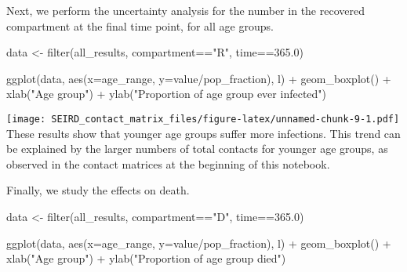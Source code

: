 \documentclass[
]{article}
\newenvironment{Shaded}{\begin{snugshade}}{\end{snugshade}}
\newcommand{\AttributeTok}[1]{\textcolor[rgb]{0.77,0.63,0.00}{#1}}
\newcommand{\FloatTok}[1]{\textcolor[rgb]{0.00,0.00,0.81}{#1}}
\newcommand{\FunctionTok}[1]{\textcolor[rgb]{0.00,0.00,0.00}{#1}}
\newcommand{\NormalTok}[1]{#1}
\newcommand{\OtherTok}[1]{\textcolor[rgb]{0.56,0.35,0.01}{#1}}
\newcommand{\SpecialCharTok}[1]{\textcolor[rgb]{0.00,0.00,0.00}{#1}}
\newcommand{\StringTok}[1]{\textcolor[rgb]{0.31,0.60,0.02}{#1}}
\begin{document}
Next, we perform the uncertainty analysis for the number in the
recovered compartment at the final time point, for all age groups.

\begin{Shaded}
\begin{Highlighting}[]

\NormalTok{data }\OtherTok{\textless{}{-}} \FunctionTok{filter}\NormalTok{(all\_results, compartment}\SpecialCharTok{==}\StringTok{"R"}\NormalTok{, time}\SpecialCharTok{==}\FloatTok{365.0}\NormalTok{)}

\FunctionTok{ggplot}\NormalTok{(data, }\FunctionTok{aes}\NormalTok{(}\AttributeTok{x=}\NormalTok{age\_range, }\AttributeTok{y=}\NormalTok{value}\SpecialCharTok{/}\NormalTok{pop\_fraction), l) }\SpecialCharTok{+}
  \FunctionTok{geom\_boxplot}\NormalTok{() }\SpecialCharTok{+}
  \FunctionTok{xlab}\NormalTok{(}\StringTok{"Age group"}\NormalTok{) }\SpecialCharTok{+}
  \FunctionTok{ylab}\NormalTok{(}\StringTok{"Proportion of age group ever infected"}\NormalTok{)}
\end{Highlighting}
\end{Shaded}

\texttt{[image: SEIRD\_contact\_matrix\_files/figure-latex/unnamed-chunk-9-1.pdf]}
These results show that younger age groups suffer more infections. This
trend can be explained by the larger numbers of total contacts for
younger age groups, as observed in the contact matrices at the beginning
of this notebook.

Finally, we study the effects on death.

\begin{Shaded}
\begin{Highlighting}[]

\NormalTok{data }\OtherTok{\textless{}{-}} \FunctionTok{filter}\NormalTok{(all\_results, compartment}\SpecialCharTok{==}\StringTok{"D"}\NormalTok{, time}\SpecialCharTok{==}\FloatTok{365.0}\NormalTok{)}

\FunctionTok{ggplot}\NormalTok{(data, }\FunctionTok{aes}\NormalTok{(}\AttributeTok{x=}\NormalTok{age\_range, }\AttributeTok{y=}\NormalTok{value}\SpecialCharTok{/}\NormalTok{pop\_fraction), l) }\SpecialCharTok{+}
  \FunctionTok{geom\_boxplot}\NormalTok{() }\SpecialCharTok{+}
  \FunctionTok{xlab}\NormalTok{(}\StringTok{"Age group"}\NormalTok{) }\SpecialCharTok{+}
  \FunctionTok{ylab}\NormalTok{(}\StringTok{"Proportion of age group died"}\NormalTok{)}
\end{Highlighting}
\end{Shaded}
\end{document}
